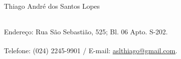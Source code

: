 {
  \noindent\LARGE{Thiago André dos Santos Lopes}
  \vspace{0.5em}
}

\begin{normalsize}
  \\
  Endereço: Rua São Sebastião, 525; Bl. 06 Apto. S-202.\\
  \\
  Telefone: (024) 2245-9901 / E-mail:
    \underline{\href{mailto:aslthiago@gmail.com}{aslthiago@gmail.com}}.
\end{normalsize}
